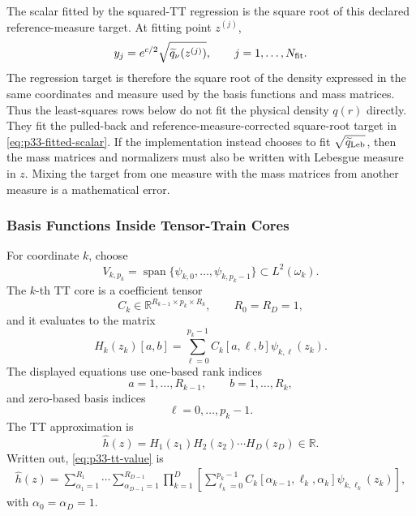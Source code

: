 \documentclass[11pt]{article}
\numberwithin{equation}{section}
\begin{document}
The scalar fitted by the squared-TT regression is the square root of this
declared reference-measure target.  At fitting point \(z^{(j)}\),
\begin{equation}
    y_j
    =
    e^{c/2}\sqrt{\widetilde q_\nu(z^{(j)})},
    \qquad
    j=1,\ldots,N_{\rm fit}.
    \label{eq:p33-fitted-scalar}
\end{equation}
The regression target is therefore the square root of the density expressed in
the same coordinates and measure used by the basis functions and mass
matrices.
Thus the least-squares rows below do not fit the physical density \(q(r)\)
directly.  They fit the pulled-back and reference-measure-corrected square-root
target in \eqref{eq:p33-fitted-scalar}.  If the implementation instead chooses
to fit \(\sqrt{\widetilde q_{\rm Leb}}\), then the mass matrices and
normalizers must also be written with Lebesgue measure in \(z\).  Mixing the
target from one measure with the mass matrices from another measure is a
mathematical error.

\subsubsection{Basis Functions Inside Tensor-Train Cores}

For coordinate \(k\), choose
\begin{equation}
    V_{k,p_k}
    =
    \operatorname{span}\{\psi_{k,0},\ldots,\psi_{k,p_k-1}\}
    \subset L^2(\omega_k).
    \label{eq:p33-univariate-space}
\end{equation}
The \(k\)-th TT core is a coefficient tensor
\begin{equation}
    C_k\in\mathbb R^{R_{k-1}\times p_k\times R_k},
    \qquad R_0=R_D=1,
    \label{eq:p33-core-shape}
\end{equation}
and it evaluates to the matrix
\begin{equation}
    H_k(z_k)[a,b]
    =
    \sum_{\ell=0}^{p_k-1}
    C_k[a,\ell,b]\psi_{k,\ell}(z_k).
    \label{eq:p33-core-eval}
\end{equation}
The displayed equations use one-based rank indices
\[
    a=1,\ldots,R_{k-1},\qquad b=1,\ldots,R_k,
\]
and zero-based basis indices
\[
    \ell=0,\ldots,p_k-1.
\]
The TT approximation is
\begin{equation}
    \widehat h(z)
    =
    H_1(z_1)H_2(z_2)\cdots H_D(z_D)\in\mathbb R.
    \label{eq:p33-tt-value}
\end{equation}
Written out, \eqref{eq:p33-tt-value} is
\begin{equation}
\begin{aligned}
    \widehat h(z)
    =
    \sum_{\alpha_1=1}^{R_1}\cdots
    \sum_{\alpha_{D-1}=1}^{R_{D-1}}
    \prod_{k=1}^{D}
    \left[
    \sum_{\ell_k=0}^{p_k-1}
    C_k[\alpha_{k-1},\ell_k,\alpha_k]\psi_{k,\ell_k}(z_k)
    \right],
\end{aligned}
    \label{eq:p33-tt-expanded}
\end{equation}
with \(\alpha_0=\alpha_D=1\).
\end{document}
